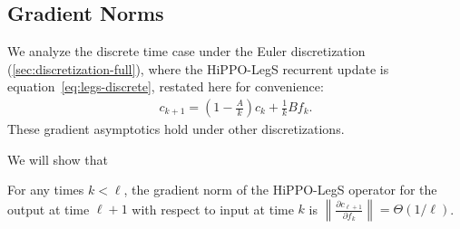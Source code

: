 \documentclass[../hippo.tex]{subfiles}
\begin{document}
\subsection{Gradient Norms}

We analyze the discrete time case under the Euler discretization (\cref{sec:discretization-full}),
where the HiPPO-LegS recurrent update is equation~\eqref{eq:legs-discrete}, restated here for convenience:
\begin{align*}
  c_{k+1} = \left( 1 - \frac{A}{k} \right) c_k + \frac{1}{k} B f_k.
\end{align*}
These gradient asymptotics hold under other discretizations.

We will show that
\begin{proposition}%
  For any times $k < \ell$, the gradient norm of the HiPPO-LegS operator
  for the output at time $\ell+1$ with respect to input at time $k$ is
  $\left\| \frac{\partial c_{\ell+1}}{\partial f_{k}} \right\| = \Theta\left( 1 / \ell \right)$.
\end{proposition}
\end{document}
